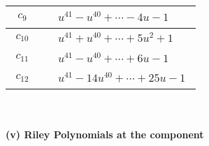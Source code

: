 \documentclass[1p]{elsarticle_modified}
\theoremstyle{definition}
\begin{document}
\begin{tabular}{m{50pt}|m{274pt}}
\hline $$\begin{aligned}c_{9}\end{aligned}$$&$\begin{aligned}
&u^{41}- u^{40}+\cdots-4 u-1
\end{aligned}$\\
\hline $$\begin{aligned}c_{10}\end{aligned}$$&$\begin{aligned}
&u^{41}+u^{40}+\cdots+5 u^2+1
\end{aligned}$\\
\hline $$\begin{aligned}c_{11}\end{aligned}$$&$\begin{aligned}
&u^{41}- u^{40}+\cdots+6 u-1
\end{aligned}$\\
\hline $$\begin{aligned}c_{12}\end{aligned}$$&$\begin{aligned}
&u^{41}-14 u^{40}+\cdots+25 u-1
\end{aligned}$\\
\hline
\end{tabular}\\~\\
\newpage\renewcommand{\arraystretch}{1}
\flushleft \textbf{(v) Riley Polynomials at the component}\newline \\
\end{document}
